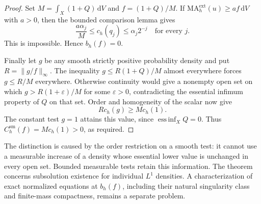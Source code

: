 \begin{proof}
Set $M=\int_X(1+Q)\,\mathrm{d}V$ and $f=(1+Q)/M$. If $\mathrm{MA}^{\mathrm{ext}}_h(u)\geq af\,\mathrm{d}V$ with $a>0$, then the bounded comparison lemma gives
\[
 \frac{a\alpha_j}{M}\leq c_h(q_j)\leq\alpha_j2^{-j}
 \quad\text{for every }j.
\]
This is impossible. Hence $b_h(f)=0$.

Finally let $g$ be any smooth strictly positive probability density and put $R=\|g/f\|_\infty$. The inequality $g\leq R(1+Q)/M$ almost everywhere forces $g\leq R/M$ everywhere. Otherwise continuity would give a nonempty open set on which $g>R(1+\varepsilon)/M$ for some $\varepsilon>0$, contradicting the essential infimum property of $Q$ on that set. Order and homogeneity of the scalar now give
\[
 R c_h(g)\geq M c_h(1).
\]
The constant test $g=1$ attains this value, since $\operatorname*{ess\,inf}_XQ=0$. Thus
$C_h^{\mathrm{sm}}(f)=M c_h(1)>0$, as required.
\end{proof}

The distinction is caused by the order restriction on a smooth test: it cannot use a measurable increase of a density whose essential lower value is unchanged in every open set. Bounded measurable tests retain this information. The theorem concerns subsolution existence for individual $L^1$ densities. A characterization of exact normalized equations at $b_h(f)$, including their natural singularity class and finite-mass compactness, remains a separate problem.
